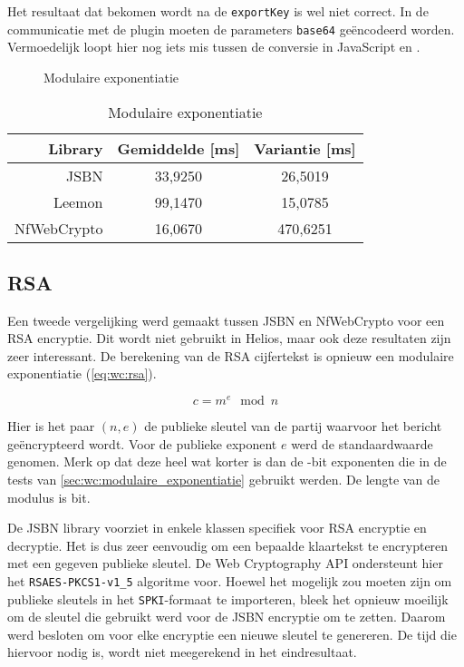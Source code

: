\npar Het resultaat dat bekomen wordt na de \texttt{exportKey} is wel niet correct. In de communicatie met de plugin moeten de parameters \texttt{base64} ge\"encodeerd worden. Vermoedelijk loopt hier nog iets mis tussen de conversie in JavaScript en \cplusplus.

\begin{figure}
  \caption{Modulaire exponentiatie}
  \label{fig:wc:modular_exponentiation}
\end{figure}

\begin{table}
  \begin{center}
    \begin{tabular}{r | c c}
      Library & Gemiddelde [ms] & Variantie [ms] \\ \hline
      JSBN & 33,9250 & 26,5019  \\
      Leemon & 99,1470 & 15,0785 \\
      NfWebCrypto & 16,0670 & 470,6251
    \end{tabular}
    \caption{Modulaire exponentiatie}
    \label{tab:wc:modular_exponentiation}
  \end{center}
\end{table}

\subsection{RSA}

Een tweede vergelijking werd gemaakt tussen JSBN en NfWebCrypto voor een RSA encryptie. Dit wordt niet gebruikt in Helios, maar ook deze resultaten zijn zeer interessant. De berekening van de RSA cijfertekst is opnieuw een modulaire exponentiatie (\ref{eq:wc:rsa}).\cite{rivest_shamir_adleman_rsa}

\begin{equation}
  \label{eq:wc:rsa}
  c = m^e \mod{n}
\end{equation}

\npar Hier is het paar $(n, e)$ de publieke sleutel van de partij waarvoor het bericht ge\"encrypteerd wordt. Voor de publieke exponent $e$ werd de standaardwaarde  genomen. Merk op dat deze heel wat korter is dan de -bit exponenten die in de tests van \ref{sec:wc:modulaire_exponentiatie} gebruikt werden. De lengte van de modulus is  bit.

\npar De JSBN library voorziet in enkele klassen specifiek voor RSA encryptie en decryptie. Het is dus zeer eenvoudig om een bepaalde klaartekst te encrypteren met een gegeven publieke sleutel. De Web Cryptography API ondersteunt hier het \texttt{RSAES-PKCS1-v1\_5} algoritme voor.\cite{rfc3447} Hoewel het mogelijk zou moeten zijn om publieke sleutels in het \texttt{SPKI}-formaat te importeren, bleek het opnieuw moeilijk om de sleutel die gebruikt werd voor de JSBN encryptie om te zetten. Daarom werd besloten om voor elke encryptie een nieuwe sleutel te genereren. De tijd die hiervoor nodig is, wordt niet meegerekend in het eindresultaat.

